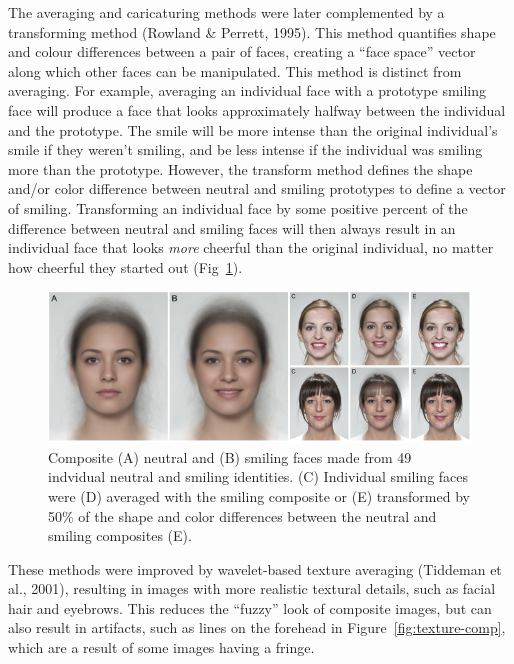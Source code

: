 \documentclass[
  doc,floatsintext]{apa6}
\begin{document}
The averaging and caricaturing methods were later complemented by a transforming method (Rowland \& Perrett, 1995). This method quantifies shape and colour differences between a pair of faces, creating a ``face space'' vector along which other faces can be manipulated. This method is distinct from averaging. For example, averaging an individual face with a prototype smiling face will produce a face that looks approximately halfway between the individual and the prototype. The smile will be more intense than the original individual's smile if they weren't smiling, and be less intense if the individual was smiling more than the prototype. However, the transform method defines the shape and/or color difference between neutral and smiling prototypes to define a vector of smiling. Transforming an individual face by some positive percent of the difference between neutral and smiling faces will then always result in an individual face that looks \emph{more} cheerful than the original individual, no matter how cheerful they started out (Fig~\ref{fig:transform-demo}).



\begin{figure}
\includegraphics[width=1\linewidth]{index_files/figure-latex/transform-demo-1} \caption{Composite (A) neutral and (B) smiling faces made from 49 indvidual neutral and smiling identities. (C) Individual smiling faces were (D) averaged with the smiling composite or (E) transformed by 50\% of the shape and color differences between the neutral and smiling composites (E).}\label{fig:transform-demo}
\end{figure}

These methods were improved by wavelet-based texture averaging (Tiddeman et al., 2001), resulting in images with more realistic textural details, such as facial hair and eyebrows. This reduces the ``fuzzy'' look of composite images, but can also result in artifacts, such as lines on the forehead in Figure~\ref{fig:texture-comp}, which are a result of some images having a fringe.
\end{document}
